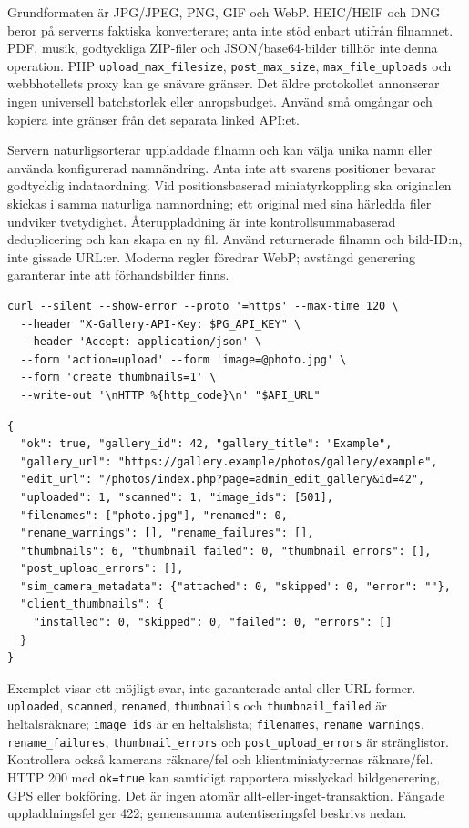 \documentclass[11pt,a4paper]{article}
\newcommand{\codeword}[1]{\nolinkurl{#1}}
\begin{document}
Grundformaten är JPG/JPEG, PNG, GIF och WebP. HEIC/HEIF och DNG beror på serverns faktiska
konverterare; anta inte stöd enbart utifrån filnamnet. PDF, musik, godtyckliga ZIP-filer och
JSON/base64-bilder tillhör inte denna operation. PHP \codeword{upload_max_filesize},
\codeword{post_max_size}, \codeword{max_file_uploads} och webbhotellets proxy kan ge snävare
gränser. Det äldre protokollet annonserar ingen universell batchstorlek eller anropsbudget.
Använd små omgångar och kopiera inte gränser från det separata linked API:et.

Servern naturligsorterar uppladdade filnamn och kan välja unika namn eller använda
konfigurerad namnändring. Anta inte att svarens positioner bevarar godtycklig indataordning.
Vid positionsbaserad miniatyrkoppling ska originalen skickas i samma naturliga namnordning;
ett original med sina härledda filer undviker tvetydighet. Återuppladdning är inte
kontrollsummabaserad deduplicering och kan skapa en ny fil. Använd returnerade filnamn och
bild-ID:n, inte gissade URL:er. Moderna regler föredrar WebP; avstängd generering garanterar
inte att förhandsbilder finns.

\begin{lstlisting}[language={}]
curl --silent --show-error --proto '=https' --max-time 120 \
  --header "X-Gallery-API-Key: $PG_API_KEY" \
  --header 'Accept: application/json' \
  --form 'action=upload' --form 'image=@photo.jpg' \
  --form 'create_thumbnails=1' \
  --write-out '\nHTTP %{http_code}\n' "$API_URL"
\end{lstlisting}

\begin{lstlisting}[language={}]
{
  "ok": true, "gallery_id": 42, "gallery_title": "Example",
  "gallery_url": "https://gallery.example/photos/gallery/example",
  "edit_url": "/photos/index.php?page=admin_edit_gallery&id=42",
  "uploaded": 1, "scanned": 1, "image_ids": [501],
  "filenames": ["photo.jpg"], "renamed": 0,
  "rename_warnings": [], "rename_failures": [],
  "thumbnails": 6, "thumbnail_failed": 0, "thumbnail_errors": [],
  "post_upload_errors": [],
  "sim_camera_metadata": {"attached": 0, "skipped": 0, "error": ""},
  "client_thumbnails": {
    "installed": 0, "skipped": 0, "failed": 0, "errors": []
  }
}
\end{lstlisting}

Exemplet visar ett möjligt svar, inte garanterade antal eller URL-former.
\codeword{uploaded}, \codeword{scanned}, \codeword{renamed}, \codeword{thumbnails} och
\codeword{thumbnail_failed} är heltalsräknare; \codeword{image_ids} är en heltalslista;
\codeword{filenames}, \codeword{rename_warnings}, \codeword{rename_failures},
\codeword{thumbnail_errors} och \codeword{post_upload_errors} är stränglistor. Kontrollera
också kamerans räknare/fel och klientminiatyrernas räknare/fel. HTTP 200 med
\codeword{ok=true} kan samtidigt rapportera misslyckad bildgenerering, GPS eller bokföring.
Det är ingen atomär allt-eller-inget-transaktion. Fångade uppladdningsfel ger 422;
gemensamma autentiseringsfel beskrivs nedan.
\end{document}
